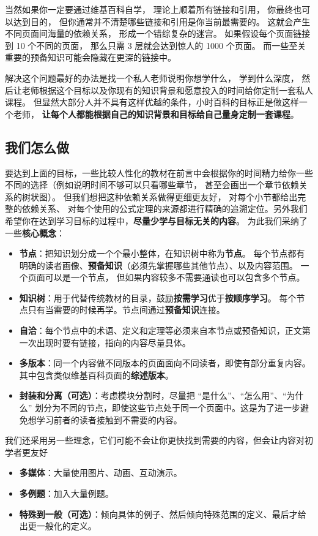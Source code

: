 当然如果你一定要通过维基百科自学， 理论上顺着所有链接和引用， 你最终也可以达到目的， 但你通常并不清楚哪些链接和引用是你当前最需要的。 这就会产生不同页面间海量的依赖关系， 形成一个错综复杂的迷宫。 如果假设每个页面链接到 10 个不同的页面， 那么只需 3 层就会达到惊人的 1000 个页面。 而一些至关重要的预备知识可能会隐藏在更深的链接中。

解决这个问题最好的办法是找一个私人老师说明你想学什么， 学到什么深度， 然后让老师根据这个目标以及你现有的知识背景和愿意投入的时间给你定制一套私人课程。 但显然大部分人并不具有这样优越的条件，小时百科的目标正是做这样一个老师， \textbf{让每个人都能根据自己的知识背景和目标给自己量身定制一套课程}。

\subsection{我们怎么做}
要达到上面的目标，一些比较人性化的教材在前言中会根据你的时间精力给你一些不同的选择（例如说明时间不够可以只看哪些章节， 甚至会画出一个章节依赖关系的树状图）。 但我们想把这种依赖关系做得更细更友好， 对每个小节都给出完整的依赖关系、 对每个使用的公式定理的来源都进行精确的追溯定位。另外我们希望你在达到学习目标的过程中，\textbf{尽量少学与目标无关的内容}。 为此我们采纳了一些\textbf{核心概念}：
\begin{itemize}
\item \textbf{节点}：把知识划分成一个个最小整体，在知识树中称为\textbf{节点}。 每个节点都有明确的读者画像、\textbf{预备知识}（必须先掌握哪些其他节点）、以及内容范围。 一个页面可以是一个节点， 但如果内容较多不需要通读也可以包含多个节点。
\item \textbf{知识树}：用于代替传统教材的目录，鼓励\textbf{按需学习}优于\textbf{按顺序学习}。 每个节点只有当需要的时候再学。节点间通过\textbf{预备知识}连接。
\item \textbf{自洽}：每个节点中的术语、定义和定理等必须来自本节点或预备知识，正文第一次出现时要有链接，指向的内容尽量具体。
\item \textbf{多版本}：同一个内容做不同版本的页面面向不同读者，即使有部分重复内容。其中包含类似维基百科页面的\textbf{综述版本}。
\item \textbf{封装和分离（可选）}：考虑模块分割时，尽量把 “是什么”、“怎么用”、“为什么” 划分为不同的节点，即使这些节点处于同一个页面中。这是为了进一步避免想学习前者的读者接触到不需要的内容。
\end{itemize}

我们还采用另一些理念，它们可能不会让你更快找到需要的内容，但会让内容对初学者更友好
\begin{itemize}
\item \textbf{多媒体}：大量使用图片、动画、互动演示。
\item \textbf{多例题}：加入大量例题。
\item \textbf{特殊到一般（可选）}：倾向具体的例子、然后倾向特殊范围的定义、最后才给出更一般化的定义。
\end{itemize}

